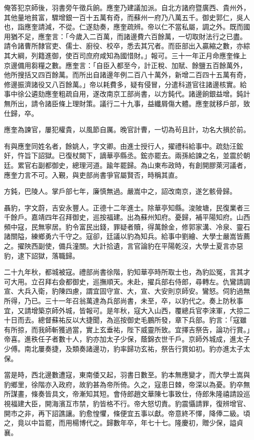 \begin{pinyinscope}
俺答犯京師後，羽書旁午徵兵餉。應奎乃建議加派。自北方諸府暨廣西、貴州外，其他量地貧富，驟增銀一百十五萬有奇，而蘇州一府乃八萬五千。御史郭仁，吳人也，詣應奎請減，不從。仁遂劾奏，應奎疏辨。帝以仁不當私屬，調之外。既而國用猶不足，應奎言：「今歲入二百萬，而諸邊費六百餘萬，一切取財法行之已盡。請令諸曹所隸官吏、儒士、廚役、校卒，悉去其冗者。而臣部出入贏縮之數，亦綜其大綱，列籍進御，使百司庶府咸知為國惜財。」報可。三十一年正月命應奎條上京邊備用芻糧之數。應奎言：「自臣入都至今，計正稅、加賦、餘鹽五百餘萬外，他所搜括又四百餘萬。而所出自諸邊年例二百八十萬外，新增二百四十五萬有奇，修邊振濟諸役又八百餘萬。」帝以耗費多，疑有侵冒，分遣科道官往諸邊核實。給事中徐公遴劾應奎粗疏自用，遂改南京工部尚書，以方鈍代。諸邊餉銀益增。鈍計無所出，請令諸臣條上理財策。議行二十九事，益纖屑傷大體。應奎就移戶部，致仕歸，卒。

應奎為諫官，屢犯權貴，以風節自厲。晚官計曹，一切為茍且計，功名大損於前。

有與應奎同姓名者，餘姚人，字文卿。由進士授行人，擢禮科給事中。疏劾汪鋐奸，忤旨下詔獄。已復杖闕下，謫華亭縣丞。鋐亦罷去。兩孫給諫之名，並震於朝廷。累官右副都御史，總理河道。踰年罷歸。為山東布政時，有創開膠萊河議者，應奎力言不可。入覲，與吏部尚書爭官屬賢否，時稱其直。

方鈍，巴陵人。掌戶部七年，廉慎無過。嚴嵩中之，詔改南京，遂乞骸骨歸。

聶豹，字文蔚，吉安永豐人。正德十二年進士。除華亭知縣。浚陂塘，民復業者三千餘戶。嘉靖四年召拜御史，巡按福建。出為蘇州知府。憂歸，補平陽知府。山西頻中寇，民無寧居。豹令富民出錢，罪疑者贖，得萬餘金，修郭家溝、冷泉、靈石諸關隘，練鄉勇六千守之。寇卻，廷議以豹為知兵。給事中劉繪、大學士嚴嵩皆薦之。擢陜西副使，備兵潼關。大計拾遺，言官論豹在平陽乾沒，大學士夏言亦惡豹，逮下詔獄，落職歸。

二十九年秋，都城被寇。禮部尚書徐階，豹知華亭時所取士也，為豹訟冤，言其才可大用。立召拜右僉都御史，巡撫順天。未赴，擢兵部右侍郎，尋轉左。仇鸞請調宣、大兵入衛，豹陳四慮，謂宜固守宣、大，宣、大安則京師安。鸞怒。伺豹過無所得，乃已。三十一年召翁萬達為兵部尚書，未至，卒，以豹代之。奏上防秋事宜，又請增築京師外城，皆報可。是年秋，寇大入山西，覆總兵官李淶軍，大掠二十日而去。總督蘇祐反以大捷聞，為巡按御史毛鵬所發，章下兵部。豹言：「寇雖有所掠，而我師斬獲過當，實上玄垂祐，陛下威靈所致。宜擇吉祭告，論功行賞。」帝喜。進秩任子者數十人，豹亦加太子少保，蔭錦衣世千戶。京師外城成，進太子少傅。南北屢奏捷，及類奏諸邊功，豹率歸功玄祐，祭告行賞如初。豹亦進太子太保。

當是時，西北邊數遭寇，東南倭又起，羽書日數至。豹本無應變才，而大學士嵩與豹鄉里，徐階亦入政府，故豹甚為帝所倚。久之，寇患日棘，帝深以為憂。豹卒無所謀畫，條奏皆具文，帝漸知其短。會侍郎趙文華陳七事致仕，侍郎朱隆禧請設巡視福建大臣，開海濱互市禁，豹皆格不行。帝大怒切責。豹震懾請罪，復辨增官、開市之非，再下詔譙讓。豹愈惶懼，條便宜五事以獻。帝意終不懌，降俸二級。頃之，竟以中旨罷，而用楊博代之。歸數年卒，年七十七。隆慶初，贈少保，謚貞襄。


\end{pinyinscope}
